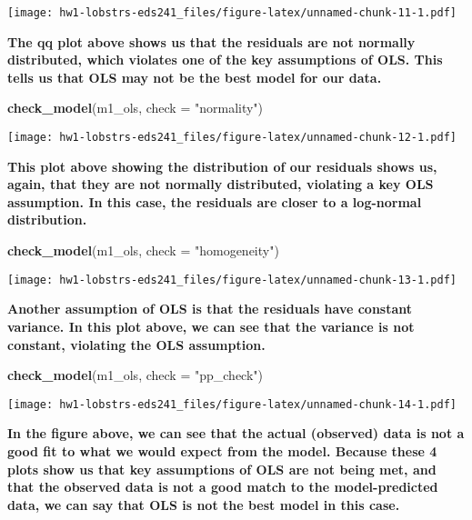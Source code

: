 \documentclass[
]{article}
\newenvironment{Shaded}{\begin{snugshade}}{\end{snugshade}}
\newcommand{\AttributeTok}[1]{\textcolor[rgb]{0.13,0.29,0.53}{#1}}
\newcommand{\FunctionTok}[1]{\textcolor[rgb]{0.13,0.29,0.53}{\textbf{#1}}}
\newcommand{\NormalTok}[1]{#1}
\newcommand{\StringTok}[1]{\textcolor[rgb]{0.31,0.60,0.02}{#1}}
\begin{document}
\texttt{[image: hw1-lobstrs-eds241\_files/figure-latex/unnamed-chunk-11-1.pdf]}

\textbf{The qq plot above shows us that the residuals are not normally
distributed, which violates one of the key assumptions of OLS. This
tells us that OLS may not be the best model for our data.}

\begin{Shaded}
\begin{Highlighting}[]
\FunctionTok{check\_model}\NormalTok{(m1\_ols, }\AttributeTok{check =} \StringTok{"normality"}\NormalTok{)}
\end{Highlighting}
\end{Shaded}

\texttt{[image: hw1-lobstrs-eds241\_files/figure-latex/unnamed-chunk-12-1.pdf]}

\textbf{This plot above showing the distribution of our residuals shows
us, again, that they are not normally distributed, violating a key OLS
assumption. In this case, the residuals are closer to a log-normal
distribution.}

\begin{Shaded}
\begin{Highlighting}[]
\FunctionTok{check\_model}\NormalTok{(m1\_ols, }\AttributeTok{check =} \StringTok{"homogeneity"}\NormalTok{)}
\end{Highlighting}
\end{Shaded}

\texttt{[image: hw1-lobstrs-eds241\_files/figure-latex/unnamed-chunk-13-1.pdf]}

\textbf{Another assumption of OLS is that the residuals have constant
variance. In this plot above, we can see that the variance is not
constant, violating the OLS assumption.}

\begin{Shaded}
\begin{Highlighting}[]
\FunctionTok{check\_model}\NormalTok{(m1\_ols, }\AttributeTok{check =} \StringTok{"pp\_check"}\NormalTok{)}
\end{Highlighting}
\end{Shaded}

\texttt{[image: hw1-lobstrs-eds241\_files/figure-latex/unnamed-chunk-14-1.pdf]}

\textbf{In the figure above, we can see that the actual (observed) data
is not a good fit to what we would expect from the model. Because these
4 plots show us that key assumptions of OLS are not being met, and that
the observed data is not a good match to the model-predicted data, we
can say that OLS is not the best model in this case.}
\end{document}
